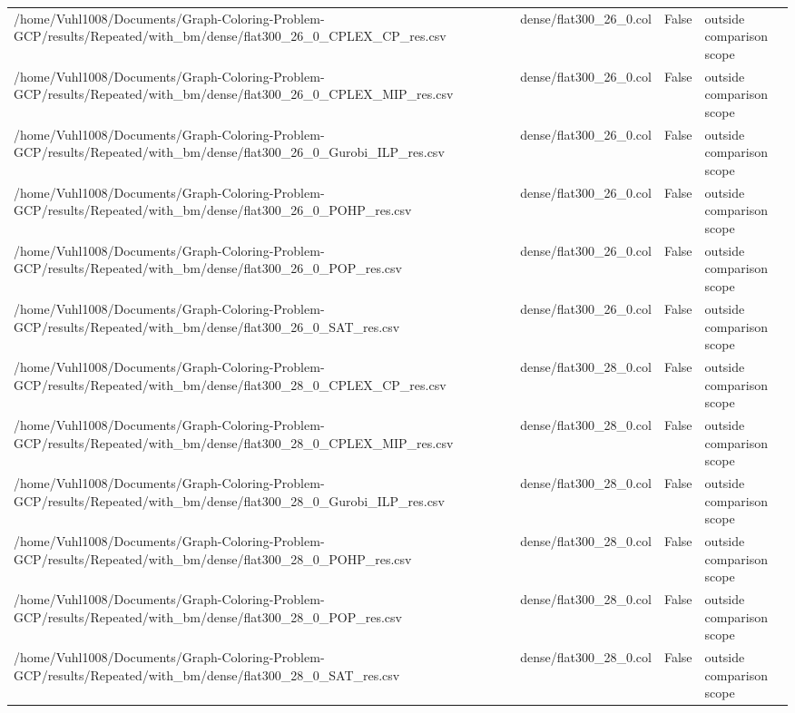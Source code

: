 \begin{table}[htbp]
\begin{tabular}{llll}
/home/Vuhl1008/Documents/Graph-Coloring-Problem-GCP/results/Repeated/with\_bm/dense/flat300\_26\_0\_CPLEX\_CP\_res.csv & dense/flat300\_26\_0.col & False & outside comparison scope \\
/home/Vuhl1008/Documents/Graph-Coloring-Problem-GCP/results/Repeated/with\_bm/dense/flat300\_26\_0\_CPLEX\_MIP\_res.csv & dense/flat300\_26\_0.col & False & outside comparison scope \\
/home/Vuhl1008/Documents/Graph-Coloring-Problem-GCP/results/Repeated/with\_bm/dense/flat300\_26\_0\_Gurobi\_ILP\_res.csv & dense/flat300\_26\_0.col & False & outside comparison scope \\
/home/Vuhl1008/Documents/Graph-Coloring-Problem-GCP/results/Repeated/with\_bm/dense/flat300\_26\_0\_POHP\_res.csv & dense/flat300\_26\_0.col & False & outside comparison scope \\
/home/Vuhl1008/Documents/Graph-Coloring-Problem-GCP/results/Repeated/with\_bm/dense/flat300\_26\_0\_POP\_res.csv & dense/flat300\_26\_0.col & False & outside comparison scope \\
/home/Vuhl1008/Documents/Graph-Coloring-Problem-GCP/results/Repeated/with\_bm/dense/flat300\_26\_0\_SAT\_res.csv & dense/flat300\_26\_0.col & False & outside comparison scope \\
/home/Vuhl1008/Documents/Graph-Coloring-Problem-GCP/results/Repeated/with\_bm/dense/flat300\_28\_0\_CPLEX\_CP\_res.csv & dense/flat300\_28\_0.col & False & outside comparison scope \\
/home/Vuhl1008/Documents/Graph-Coloring-Problem-GCP/results/Repeated/with\_bm/dense/flat300\_28\_0\_CPLEX\_MIP\_res.csv & dense/flat300\_28\_0.col & False & outside comparison scope \\
/home/Vuhl1008/Documents/Graph-Coloring-Problem-GCP/results/Repeated/with\_bm/dense/flat300\_28\_0\_Gurobi\_ILP\_res.csv & dense/flat300\_28\_0.col & False & outside comparison scope \\
/home/Vuhl1008/Documents/Graph-Coloring-Problem-GCP/results/Repeated/with\_bm/dense/flat300\_28\_0\_POHP\_res.csv & dense/flat300\_28\_0.col & False & outside comparison scope \\
/home/Vuhl1008/Documents/Graph-Coloring-Problem-GCP/results/Repeated/with\_bm/dense/flat300\_28\_0\_POP\_res.csv & dense/flat300\_28\_0.col & False & outside comparison scope \\
/home/Vuhl1008/Documents/Graph-Coloring-Problem-GCP/results/Repeated/with\_bm/dense/flat300\_28\_0\_SAT\_res.csv & dense/flat300\_28\_0.col & False & outside comparison scope \\

\end{tabular}
\end{table}
